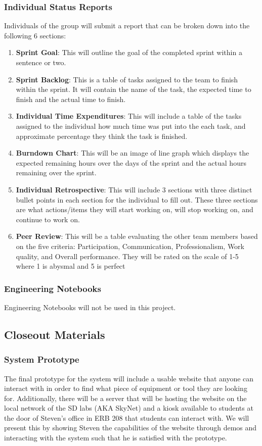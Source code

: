 \subsubsection{Individual Status Reports}
Individuals of the group will submit a report that can be broken down into the following 6 sections:
\begin{enumerate}
    \item \textbf{Sprint Goal}: This will outline the goal of the completed sprint within a sentence or two.
    \item \textbf{Sprint Backlog}: This is a table of tasks assigned to the team to finish within the sprint. It will contain the name of the task, the expected time to finish and the actual time to finish.
    \item \textbf{Individual Time Expenditures}: This will include a table of the tasks assigned to the individual how much time was put into the each task, and approximate percentage they think the task is finished.
    \item \textbf{Burndown Chart}: This will be an image of line graph which displays the expected remaining hours over the days of the sprint and the actual hours remaining over the sprint.
    \item \textbf{Individual Retrospective}: This will include 3 sections with three distinct bullet points in each section for the individual to fill out. These three sections are what actions/items they will start working on, will stop working on, and continue to work on.
    \item \textbf{Peer Review}: This will be a table evaluating the other team members based on the five criteria: Participation, Communication, Professionalism, Work quality, and Overall performance.  They will be rated on the scale of 1-5 where 1 is abysmal and 5 is perfect
\end{enumerate}

\subsubsection{Engineering Notebooks}
Engineering Notebooks will not be used in this project.

\subsection{Closeout Materials}

\subsubsection{System Prototype}
The final prototype for the system will include a usable website that anyone can interact with in order to find what piece of equipment or tool they are looking for. Additionally, there will be a server that will be hosting the website on the local network of the SD labs (AKA SkyNet) and a kiosk available to students at the door of Steven's office in ERB 208 that students can interact with.
We will present this by showing Steven the capabilities of the website through demos and interacting with the system such that he is satisfied with the prototype.


